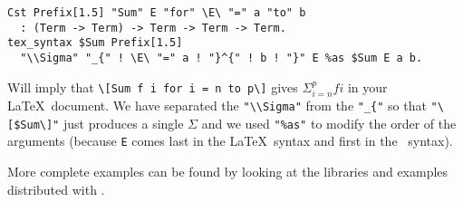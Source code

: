 \begin{verbatim}
Cst Prefix[1.5] "Sum" E "for" \E\ "=" a "to" b 
  : (Term -> Term) -> Term -> Term -> Term.
tex_syntax $Sum Prefix[1.5] 
  "\\Sigma" "_{" ! \E\ "=" a ! "}^{" ! b ! "}" E %as $Sum E a b.
\end{verbatim}
Will imply that \verb#\[Sum f i for i = n to p\]# gives $\Sigma_{i = n}^{p} f
i$ in your \LaTeX\ document. We have separated the \verb#"\\Sigma"# from the
\verb#"_{"# so that \verb#"\[$Sum\]"# just produces a single $\Sigma$ and we 
used \verb#"%as"# to modify the order of the arguments (because {\tt E} comes
last in the \LaTeX\ syntax and first in the \AFD\ syntax).

More complete examples can be found by looking at the libraries and examples
distributed with \AFD.


 



